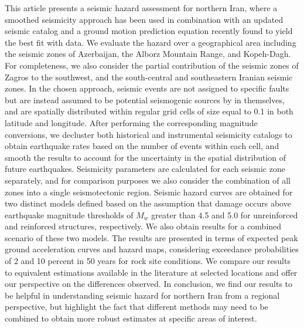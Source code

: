 % 
This article presents a seismic hazard assessment for northern Iran, where a smoothed seismicity approach has been used in combination with an updated seismic catalog and a ground motion prediction equation recently found to yield the best fit with data. We evaluate the hazard over a geographical area including the seismic zones of Azerbaijan, the Alborz Mountain Range, and Kopeh-Dagh. For completeness, we also consider the partial contribution of the seismic zones of Zagros to the southwest, and the south-central and southeastern Iranian seismic zones. In the chosen approach, seismic events are not assigned to specific faults but are instead assumed to be potential seismogenic sources by in themselves, and are spatially distributed within regular grid cells of size equal to 0.1\textdegree{} in both latitude and longitude. After performing the corresponding magnitude conversions, we decluster both historical and instrumental seismicity catalogs to obtain earthquake rates based on the number of events within each cell, and smooth the results to account for the uncertainty in the spatial distribution of future earthquakes. Seismicity parameters are calculated for each seismic zone separately, and for comparison purposes we also consider the combination of all zones into a single seismotectonic region. Seismic hazard curves are obtained for two distinct models defined based on the assumption that damage occurs above earthquake magnitude thresholds of $M_w$ greater than 4.5 and 5.0 for unreinforced and reinforced structures, respectively. We also obtain results for a combined scenario of these two models. The results are presented in terms of expected peak ground acceleration curves and hazard maps, considering exceedance probabilities of 2 and 10 percent in 50 years for rock site conditions. We compare our results to equivalent estimations available in the literature at selected locations and offer our perspective on the differences observed. In conclusion, we find our results to be helpful in understanding seismic hazard for northern Iran from a regional perspective, but highlight the fact that different methods may need to be combined to obtain more robust estimates at specific areas of interest.




